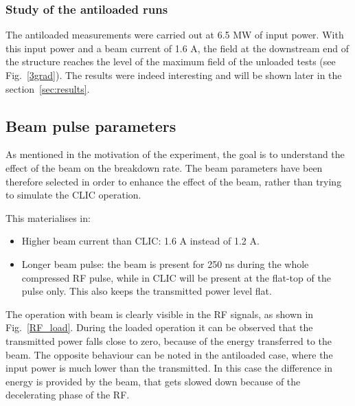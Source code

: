 \subsubsection{Study of the antiloaded runs}

The antiloaded measurements were carried out at 6.5 MW of input power. With this input power and a beam current of 1.6 A, the field at the downstream end of the structure reaches the level of the maximum field of the unloaded tests (see Fig.~\ref{3grad}). The results were indeed interesting and will be shown later in the section~\ref{sec:results}. 




\subsection[Beam pulse parameters]{Beam pulse parameters}

As mentioned in the motivation of the experiment, the goal is to understand the effect of the beam on the breakdown rate. The beam parameters have been therefore selected in order to enhance the effect of the beam, rather than trying to simulate the CLIC operation. 

This materialises in:
\begin{itemize}
\item Higher beam current than CLIC: 1.6 A instead of 1.2 A.
\item Longer beam pulse: the beam is present for 250 ns during the whole compressed RF pulse,  while in CLIC will be present at the flat-top of the pulse only. This also keeps the transmitted power level flat.
\end{itemize}
The operation with beam is clearly visible  in the RF signals, as shown in Fig.~\ref{RF_load}. During the loaded operation it can be observed that the transmitted power falls close to zero, because of the energy transferred to the beam. The opposite behaviour can be noted in the antiloaded case, where the input power is much lower than the transmitted. In this case the difference in energy is provided by the beam, that gets slowed down because of the decelerating phase of the RF. 

